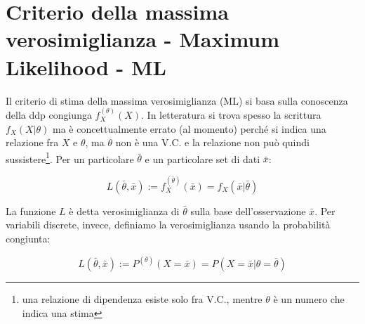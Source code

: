 \section{Criterio della massima verosimiglianza - Maximum Likelihood - ML}
Il criterio di stima della massima verosimiglianza  (ML) si basa sulla conoscenza della ddp congiunga $f_X^{(\theta)}(X)$. In letteratura si trova spesso la scrittura $f_X(X|\theta)$ ma è concettualmente errato (al momento) perché si indica una relazione fra $X$ e $\theta$, ma $\theta$ non è una V.C. e la relazione non può quindi sussistere\footnote{una relazione di dipendenza esiste solo fra V.C., mentre $\theta$ è un numero che indica una stima}.\newline
Per un particolare $\bar{\theta}$ e un particolare set di dati $\bar{x}$:

    \[ L(\bar{\theta},\bar{x}):=f_X^{(\bar{\theta})}(\bar{x})=f_X(\bar{x}|\bar{\theta}) \]

La funzione $L$ è detta verosimiglianza di $\bar{\theta}$ sulla base dell'osservazione $\bar{x}$. Per variabili discrete, invece, definiamo la verosimiglianza  usando la probabilità congiunta:

    \[ L(\bar{\theta},\bar{x}):=P^{(\bar{\theta})}(X=\bar{x})=P(X=\bar{x}|\theta=\bar{\theta}) \]

